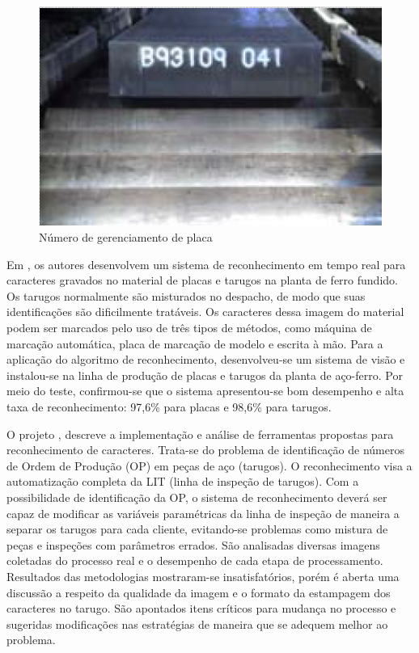 \begin{figure}[htbp]
	\centering
	\includegraphics[width=0.5\linewidth]{figuras/Steel/SMN.png}
	\caption{Número de gerenciamento de placa}
	\label{fig:SMN}
\end{figure}


Em , os autores desenvolvem um sistema de reconhecimento em tempo real para caracteres gravados no material de placas e tarugos na planta de ferro fundido. 
%
Os tarugos normalmente são misturados no despacho, de modo que suas identificações são dificilmente tratáveis. Os caracteres dessa imagem do material podem ser marcados pelo uso de três tipos de métodos, como máquina de marcação automática, placa de marcação de modelo e escrita à mão. Para a aplicação do algoritmo de reconhecimento, desenvolveu-se um sistema de visão e instalou-se na linha de produção de placas e tarugos da planta de aço-ferro. Por meio do teste, confirmou-se que o sistema apresentou-se bom desempenho e alta taxa de reconhecimento: 97,6\% para placas e 98,6\% para tarugos.

O projeto \citeauthor{ref3}, descreve a implementação e análise de ferramentas propostas para reconhecimento de caracteres. Trata-se do problema de identificação de números de Ordem de Produção (OP) em peças de aço
(tarugos). O reconhecimento visa a automatização completa da LIT (linha de inspeção de tarugos). Com a possibilidade de identificação da OP, o sistema de reconhecimento deverá ser capaz de modificar as variáveis paramétricas da linha de inspeção de maneira a separar os tarugos para cada cliente, evitando-se problemas como mistura de peças e inspeções com parâmetros errados. São analisadas diversas imagens coletadas do processo real e o desempenho de cada etapa de processamento. Resultados das metodologias mostraram-se insatisfatórios, porém é aberta uma discussão a respeito da qualidade da imagem e o formato da estampagem dos caracteres no tarugo. São apontados itens críticos para mudança no processo e sugeridas modificações nas estratégias de maneira que se adequem melhor ao problema.




